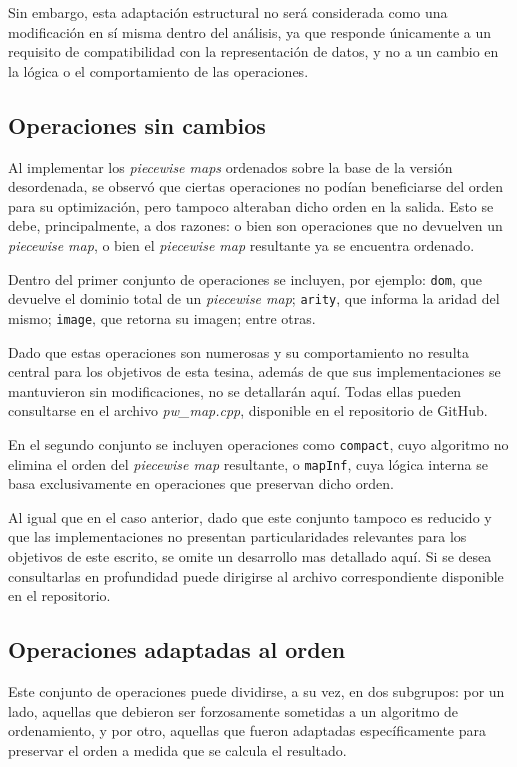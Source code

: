 Sin embargo, esta adaptación estructural no será considerada como una modificación en sí misma dentro del análisis, ya que responde únicamente a un requisito de compatibilidad con la representación de datos, y no a un cambio en la lógica o el comportamiento de las operaciones.


\subsection{Operaciones sin cambios}

Al implementar los \textit{piecewise maps} ordenados sobre la base de la versión desordenada, se observó que ciertas operaciones no podían beneficiarse del orden para su optimización, pero tampoco alteraban dicho orden en la salida. Esto se debe, principalmente, a dos razones: o bien son operaciones que no devuelven un \textit{piecewise map}, o bien el \textit{piecewise map} resultante ya se encuentra ordenado.

Dentro del primer conjunto de operaciones se incluyen, por ejemplo: \texttt{dom}, que devuelve el dominio total de un \textit{piecewise map}; \texttt{arity}, que informa la aridad del mismo; \texttt{image}, que retorna su imagen; entre otras.

Dado que estas operaciones son numerosas y su comportamiento no resulta central para los objetivos de esta tesina, además de que sus implementaciones se mantuvieron sin modificaciones, no se detallarán aquí. Todas ellas pueden consultarse en el archivo \textit{pw\_map.cpp}, disponible en el repositorio de GitHub.

En el segundo conjunto se incluyen operaciones como \texttt{compact}, cuyo algoritmo no elimina el orden del \textit{piecewise map} resultante, o \texttt{mapInf}, cuya lógica interna se basa exclusivamente en operaciones que preservan dicho orden.

Al igual que en el caso anterior, dado que este conjunto tampoco es reducido y que las implementaciones no presentan particularidades relevantes para los objetivos de este escrito, se omite un desarrollo mas detallado aquí. Si se desea consultarlas en profundidad puede dirigirse al archivo correspondiente disponible en el repositorio.

\subsection{Operaciones adaptadas al orden}

Este conjunto de operaciones puede dividirse, a su vez, en dos subgrupos: por un lado, aquellas que debieron ser forzosamente sometidas a un algoritmo de ordenamiento, y por otro, aquellas que fueron adaptadas específicamente para preservar el orden a medida que se calcula el resultado.

